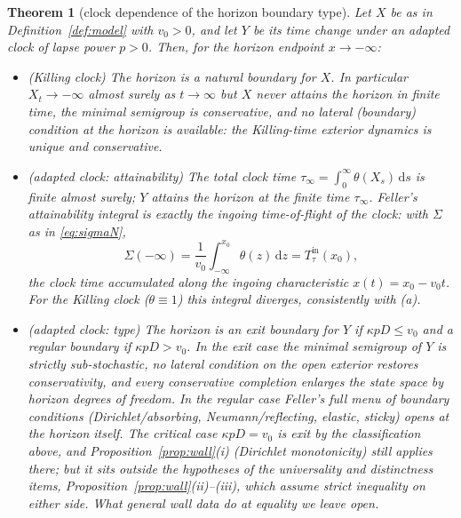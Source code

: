 \documentclass[11pt]{article}
\newtheorem{theorem}{Theorem}[section]
\theoremstyle{definition}
\theoremstyle{remark}
\newcommand{\dd}{\mathrm{d}}
\begin{document}
\begin{theorem}[clock dependence of the horizon boundary type]
\label{thm:clock}
Let $X$ be as in Definition~\ref{def:model} with $v_{0}>0$, and let
$Y$ be its time change under an adapted clock of lapse power $p>0$.
Then, for the horizon endpoint $x\to-\infty$:
\begin{itemize}
\item[(a)] \textup{(Killing clock)} The horizon is a \emph{natural}
boundary for $X$. In particular $X_{t}\to-\infty$ almost surely as
$t\to\infty$ but $X$ never attains the horizon in finite time, the
minimal semigroup is conservative, and no lateral (boundary)
condition at the horizon is available: the Killing-time exterior
dynamics is unique and conservative.
\item[(b)] \textup{(adapted clock: attainability)} The total clock
time $\tau_{\infty}=\int_{0}^{\infty}\theta(X_{s})\,\dd s$ is finite
almost surely; $Y$ attains the horizon at the finite time
$\tau_{\infty}$. Feller's attainability integral is \emph{exactly}
the ingoing time-of-flight of the clock: with
$\Sigma$ as in \eqref{eq:sigmaN},
\begin{equation}
\Sigma(-\infty)
=\frac{1}{v_{0}}\int_{-\infty}^{x_{0}}\theta(z)\,\dd z
=T^{\mathrm{in}}_{\tau}(x_{0}),
\label{eq:sigma-tof}
\end{equation}
the clock time accumulated along the ingoing characteristic
$x(t)=x_{0}-v_{0}t$. For the Killing clock ($\theta\equiv1$) this
integral diverges, consistently with (a).
\item[(c)] \textup{(adapted clock: type)} The horizon is an
\emph{exit} boundary for $Y$ if $\kappa p D\le v_{0}$ and a
\emph{regular} boundary if $\kappa pD>v_{0}$. In the exit case the
minimal semigroup of $Y$ is strictly sub-stochastic, no lateral
condition on the open exterior restores conservativity, and every
conservative completion enlarges the state space by horizon degrees
of freedom. In the regular case Feller's full menu of boundary
conditions (Dirichlet/absorbing, Neumann/reflecting, elastic, sticky)
opens at the horizon itself. The critical case $\kappa pD=v_{0}$ is
exit by the classification above, and
Proposition~\ref{prop:wall}(i) (Dirichlet monotonicity) still applies
there; but it sits outside the hypotheses of the universality and
distinctness items, Proposition~\ref{prop:wall}(ii)--(iii), which
assume strict inequality on either side. What general wall data do
\emph{at} equality we leave open.
\end{itemize}
\end{theorem}
\end{document}
